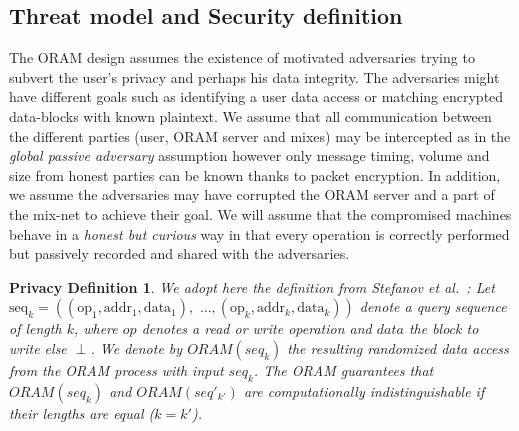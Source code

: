\documentclass{llncs}
\newtheorem{privdef}{Privacy Definition}
\begin{document}
\subsection{Threat model and Security definition}\label{Threat}

The ORAM design assumes the existence of motivated adversaries trying to subvert the user's privacy and perhaps his data integrity.
The adversaries might have different goals such as identifying a user data access or matching encrypted data-blocks with known plaintext. 
\noindent We assume that all communication between the different parties (user, ORAM server and mixes) may be intercepted as in the \textit{global passive adversary} assumption however only message timing, volume and size from honest parties can be known thanks to packet encryption.
In addition, we assume the adversaries may have corrupted the ORAM server and a part of the mix-net to achieve their goal.
We will assume that the compromised machines behave in a \textit{honest but curious} way in that every operation is correctly performed but passively recorded and shared with the adversaries.

\begin{privdef}\label{def:Oram}
We adopt here the definition from Stefanov et al.~\cite{stefanov2011towards}: Let $\text{seq}_k=((\text{op}_1, \text{addr}_1, \text{data}_1), \text{ ...},(\text{op}_k, \text{addr}_k, \text{data}_k))$ denote a query sequence of length $k$, where $op$ denotes a read or write operation and $data$ the block to write else $
\perp$.
We denote by $ORAM(seq_k)$ the resulting randomized data access from the ORAM process with input $seq_k$.
The ORAM guarantees that $ORAM(seq_k)$ and $ORAM(seq'_{k'})$ are computationally indistinguishable if their lengths are equal ($k=k'$).
\end{privdef}
\end{document}
